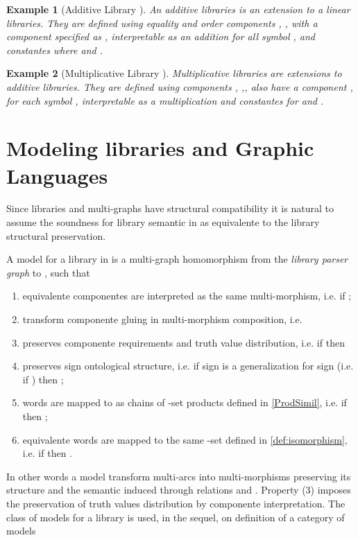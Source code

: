 \documentclass[oribibl]{llncs}
\newtheorem{exam}{Example}
\begin{document}
\begin{exam}[Additive Library ]\label{addlibrary}
An additive libraries  is an extension to a linear libraries. They are defined
using equality and order components , ,
with a component specified as , interpretable as an
addition for all symbol , and constantes  where  and .
\end{exam}

\begin{exam}[Multiplicative Library ]\label{multlibary}
Multiplicative libraries  are extensions to additive libraries. They are
defined using components , ,,
also have a component , for each symbol ,
interpretable as a multiplication and constantes  for  and .
\end{exam}

\section{Modeling libraries and Graphic Languages}\label{modeling libraries}

Since libraries and multi-graphs have structural compatibility it is natural to assume the soundness for library semantic in  as equivalente to the library structural preservation.

A model for a library  in  is a multi-graph homomorphism  from the \emph{library parser graph}  to ,
 such that
\begin{enumerate}
  \item equivalente componentes are interpreted as the same multi-morphism, i.e.  if ;
  \item transform componente gluing in multi-morphism composition, i.e. 
  \item preserves componente requirements and truth value distribution, i.e. if  then 
  \item preserves sign ontological structure, i.e. if sign  is a generalization for sign  (i.e. if ) then ;
  \item words are mapped to as chains of -set products defined in \ref{ProdSimil}, i.e. if  then ;
  \item equivalente words are mapped to the same -set defined in \ref{def:isomorphism}, i.e. if  then .
\end{enumerate}
In other words a model transform multi-arcs into multi-morphisms preserving its structure and the semantic induced through relations  and . Property (3) imposes the preservation of truth values distribution by componente interpretation. The class of models for a library  is used, in the sequel, on definition of a category of models 
\end{document}
